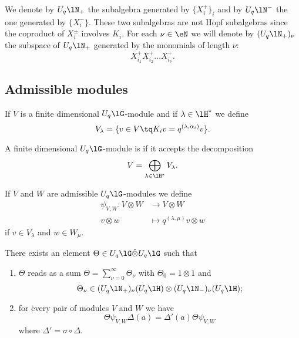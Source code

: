 We denote by \( U_q\lN_+\) the subalgebra generated by \( \{ X^+ _i\}_i\) and by \( U_q\lN^-\) the one generated by \( \{ X_i^- \}\). These two subalgebras are not Hopf subalgebras since the coproduct of \( X^{\pm}_i\) involves \( K_i\). For each \( \nu\in\eN\) we will denote by \( (U_q\lN_+)_{\nu}\) the subspace of \( U_q\lN_+\) generated by the monomials of length \( \nu\):
\begin{equation}
	X_{i_1}^{+}X_{i_2}^+\ldots X_{i_{\nu}}^+.
\end{equation}


\subsection{Admissible modules}

If \( V\) is a finite dimensional \( U_q\lG\)-module and if \( \lambda\in\lH^*\) we define
\begin{equation}
	V_{\lambda}=\{ v\in V\tq K_iv=q^{(\lambda,\alpha_i)}v \}.
\end{equation}
\begin{definition}
	A finite dimensional \( U_q\lG\)-module is  if it accepts the decomposition
	\begin{equation}
		V=\bigoplus_{\lambda\in\lH^*}V_{\lambda}.
	\end{equation}
\end{definition}

If \( V\) and \( W\) are admissible \( U_q\lG\)-modules we define
\begin{equation}
	\begin{aligned}
		\psi_{V,W}\colon V\otimes W & \to V\otimes W                      \\
		v\otimes w                  & \mapsto q^{(\lambda,\mu)}v\otimes w
	\end{aligned}
\end{equation}
if \( v\in V_{\lambda}\) and \( w\in W_{\mu}\).

\begin{theorem}
	There exists an element \( \Theta\in U_q\lG\hat\otimes U_q\lG\) such that
	\begin{enumerate}
		\item
		      \( \Theta  \) reads as a sum \( \Theta=\sum_{\nu=0}^{\infty}\Theta_{\nu}\) with \( \Theta_0=1\otimes 1\) and
		      \begin{equation}
			      \Theta_{\nu}\in (U_q\lN_+)_{\nu}(U_q\lH)\otimes(U_q\lN_-)_{\nu}(U_q\lH);
		      \end{equation}
		\item
		      for every pair of modules \( V\) and \( W\) we have
		      \begin{equation}
			      \Theta\psi_{V,W}\Delta(a)=\Delta'(a)\Theta\psi_{V,W}
		      \end{equation}
		      where \( \Delta'=\sigma\circ\Delta\).
	\end{enumerate}
\end{theorem}

